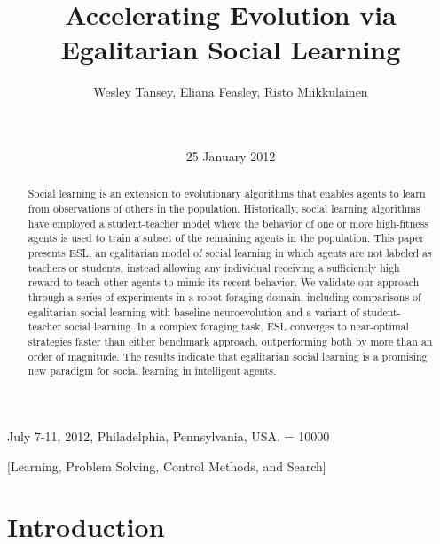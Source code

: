 \documentclass{sig-alternate}
\begin{document}
 {July 7-11, 2012, Philadelphia, Pennsylvania, USA.}
\widowpenalty = 10000
    
\title{Accelerating Evolution via Egalitarian Social Learning}

\author{
\alignauthor
Wesley Tansey, Eliana Feasley, Risto Miikkulainen\\
       \\
       \\
}
\date{25 January 2012}

\maketitle
\begin{abstract}
Social learning is an extension to evolutionary algorithms that enables agents to learn from observations of others in the population. Historically, social learning algorithms have employed a student-teacher model where the behavior of one or more high-fitness agents is used to train a subset of the remaining agents in the population. This paper presents ESL, an egalitarian model of social learning in which agents are not labeled as teachers or students, instead allowing any individual receiving a sufficiently high reward to teach other agents to mimic its recent behavior. We validate our approach through a series of experiments in a robot foraging domain, including comparisons of egalitarian social learning with baseline neuroevolution and a variant of student-teacher social learning. In a complex foraging task, ESL converges to near-optimal strategies faster than either benchmark approach, outperforming both by more than an order of magnitude. The results indicate that egalitarian social learning is a promising new paradigm for social learning in intelligent agents.
\end{abstract}

[Learning, Problem Solving, Control Methods, and Search]



\section{Introduction}
\end{document}
